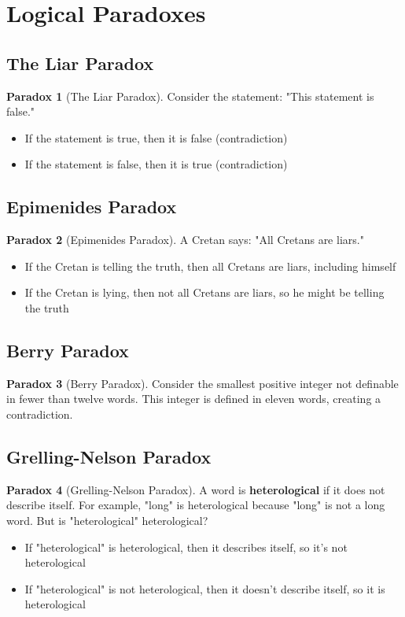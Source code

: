 \documentclass[11pt]{article}
\theoremstyle{definition}
\newtheorem{paradox}{Paradox}[section]
\begin{document}
\section{Logical Paradoxes}

\subsection{The Liar Paradox}
\begin{paradox}[The Liar Paradox]
Consider the statement: "This statement is false."
\begin{itemize}
    \item If the statement is true, then it is false (contradiction)
    \item If the statement is false, then it is true (contradiction)
\end{itemize}
\end{paradox}

\subsection{Epimenides Paradox}
\begin{paradox}[Epimenides Paradox]
A Cretan says: "All Cretans are liars."
\begin{itemize}
    \item If the Cretan is telling the truth, then all Cretans are liars, including himself
    \item If the Cretan is lying, then not all Cretans are liars, so he might be telling the truth
\end{itemize}
\end{paradox}

\subsection{Berry Paradox}
\begin{paradox}[Berry Paradox]
Consider the smallest positive integer not definable in fewer than twelve words. This integer is defined in eleven words, creating a contradiction.
\end{paradox}

\subsection{Grelling-Nelson Paradox}
\begin{paradox}[Grelling-Nelson Paradox]
A word is \textbf{heterological} if it does not describe itself. For example, "long" is heterological because "long" is not a long word. But is "heterological" heterological?
\begin{itemize}
    \item If "heterological" is heterological, then it describes itself, so it's not heterological
    \item If "heterological" is not heterological, then it doesn't describe itself, so it is heterological
\end{itemize}
\end{paradox}
\end{document}
